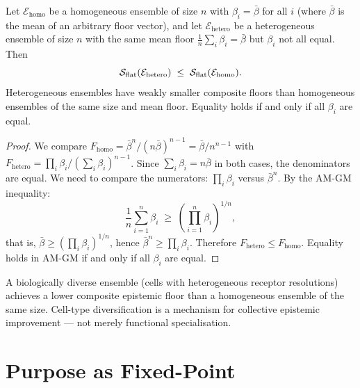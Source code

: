 \begin{theorem}
\label{thm:floor-heterogeneity}
Let $\mathcal{E}_{\mathrm{homo}}$ be a homogeneous ensemble of size $n$ with
$\beta_i = \bar{\beta}$ for all $i$ (where $\bar{\beta}$ is the mean of an
arbitrary floor vector), and let $\mathcal{E}_{\mathrm{hetero}}$ be a
heterogeneous ensemble of size $n$ with the same mean floor
$\frac{1}{n}\sum_i \beta_i = \bar{\beta}$ but $\beta_i$ not all equal.  Then
\[
  \mathcal{S}_{\mathrm{flat}}(\mathcal{E}_{\mathrm{hetero}})
  \;\leq\;
  \mathcal{S}_{\mathrm{flat}}(\mathcal{E}_{\mathrm{homo}}) .
\]
Heterogeneous ensembles have weakly smaller composite floors than homogeneous
ensembles of the same size and mean floor.  Equality holds if and only if all
$\beta_i$ are equal.
\end{theorem}

\begin{proof}
We compare
$F_{\mathrm{homo}} = \bar{\beta}^n / (n\bar{\beta})^{n-1} = \bar{\beta}/n^{n-1}$
with $F_{\mathrm{hetero}} = \prod_i \beta_i / (\sum_i \beta_i)^{n-1}$.
Since $\sum_i \beta_i = n\bar{\beta}$ in both cases, the denominators are equal.
We need to compare the numerators: $\prod_i \beta_i$ versus $\bar{\beta}^n$.
By the AM-GM inequality:
\[
  \frac{1}{n}\sum_{i=1}^n \beta_i \;\geq\; \left(\prod_{i=1}^n \beta_i\right)^{1/n},
\]
that is, $\bar{\beta} \geq (\prod_i \beta_i)^{1/n}$, hence
$\bar{\beta}^n \geq \prod_i \beta_i$.
Therefore $F_{\mathrm{hetero}} \leq F_{\mathrm{homo}}$.
Equality holds in AM-GM if and only if all $\beta_i$ are equal.
\end{proof}

\begin{corollary}
\label{cor:diversity-reduces-blindness}
A biologically diverse ensemble (cells with heterogeneous receptor resolutions)
achieves a lower composite epistemic floor than a homogeneous ensemble of the
same size.  Cell-type diversification is a mechanism for collective epistemic
improvement — not merely functional specialisation.
\end{corollary}

\section{Purpose as Fixed-Point}
\label{sec:purpose-fixed-point}

